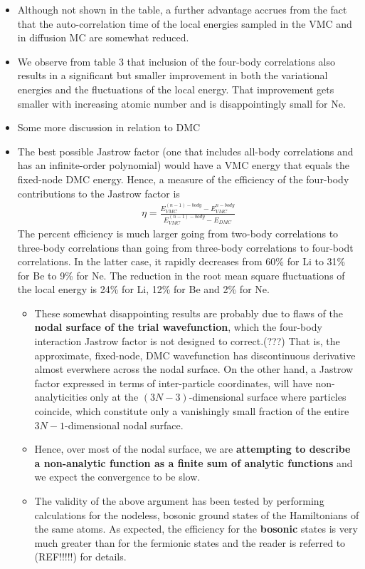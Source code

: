 \documentclass[twoside,english]{uiofysmaster}
\begin{document}
\begin{itemize}
\begin{itemize}
		\item Although not shown in the table, a further advantage accrues from the fact that the auto-correlation time of the local energies sampled in the VMC and in diffusion MC are somewhat reduced. 
		\item We observe from table 3 that inclusion of the four-body correlations also results in a significant but smaller improvement in both the variational energies and the fluctuations of the local energy. That improvement gets smaller with increasing atomic number and is disappointingly small for Ne.
		\item Some more discussion in relation to DMC
		\item The best possible Jastrow factor (one that includes all-body correlations and has an infinite-order polynomial) would have a VMC energy that equals the fixed-node DMC energy. Hence, a measure of the efficiency of the four-body contributions to the Jastrow factor is
		\begin{align}
			\eta = \frac{ E_{VMC}^{(n-1)-body} - E_{VMC}^{n-body} }{ E_{VMC}^{(n-1)-body} - E_{DMC} }
		\end{align}
		The percent efficiency is much larger going from two-body correlations to three-body correlations than going from three-body correlations to four-bodt correlations. In the latter case, it rapidly decreases from 60\% for Li to 31\% for Be to 9\% for Ne. The reduction in the root mean square fluctuations of the local energy is 24\% for Li, 12\% for Be and 2\% for Ne. 
		\begin{itemize}
			\item These somewhat disappointing results are probably due to flaws of the \textbf{nodal surface of the trial wavefunction}, which the four-body interaction Jastrow factor is not designed to correct.(???) That is, the approximate, fixed-node, DMC wavefunction has discontinuous derivative almost everwhere across the nodal surface. On the other hand, a Jastrow factor expressed in terms of inter-particle coordinates, will have non-analyticities only at the $(3N-3)$-dimensional surface where particles coincide, which constitute only a vanishingly small fraction of the entire $3N-1$-dimensional nodal surface.
			\item Hence, over most of the nodal surface, we are \textbf{attempting to describe a non-analytic function as a finite sum of analytic functions} and we expect the convergence to be slow. 
			\item The validity of the above argument has been tested by performing calculations for the nodeless, bosonic ground states of the Hamiltonians of the same atoms. As expected, the efficiency for the \textbf{bosonic} states is very much greater than for the fermionic states and the reader is referred to (REF!!!!!) for details.

\end{itemize}
\end{itemize}
\end{itemize}
\end{document}
